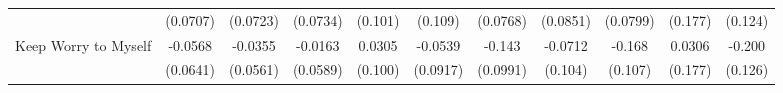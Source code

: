 {\begin{tabular}{l*{10}{c}}
            &    (0.0707)         &    (0.0723)         &    (0.0734)         &     (0.101)         &     (0.109)         &    (0.0768)         &    (0.0851)         &    (0.0799)         &     (0.177)         &     (0.124)         \\
\addlinespace
Keep Worry to Myself&     -0.0568         &     -0.0355         &     -0.0163         &      0.0305         &     -0.0539         &      -0.143         &     -0.0712         &      -0.168         &      0.0306         &      -0.200         \\
            &    (0.0641)         &    (0.0561)         &    (0.0589)         &     (0.100)         &    (0.0917)         &    (0.0991)         &     (0.104)         &     (0.107)         &     (0.177)         &     (0.126)         \\
\bottomrule
\end{tabular}
}
